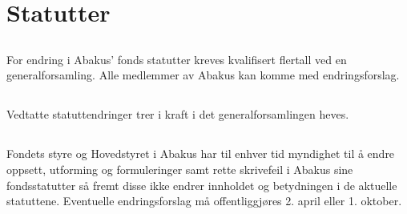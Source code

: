 \section{Statutter}

\subsection{}
For endring i Abakus’ fonds statutter kreves kvalifisert flertall ved en
generalforsamling. Alle medlemmer av Abakus kan komme med endringsforslag.

\subsection{}
Vedtatte statuttendringer trer i kraft i det generalforsamlingen heves.

\subsection{}
Fondets styre og Hovedstyret i Abakus har til enhver tid myndighet til å endre oppsett, utforming og formuleringer samt rette skrivefeil i Abakus sine fondsstatutter så fremt disse ikke endrer innholdet og betydningen i de aktuelle statuttene. Eventuelle endringsforslag må offentliggjøres 2. april eller 1. oktober.
